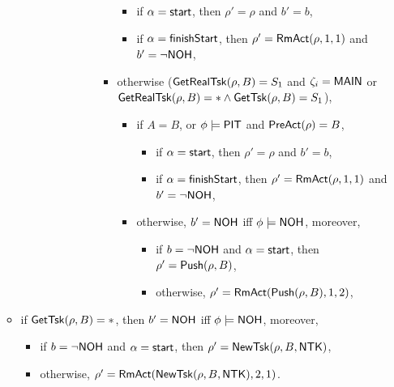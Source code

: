 \begin{itemize}
\begin{itemize}
\begin{itemize}
\begin{itemize}
\begin{itemize}
\begin{itemize}
\begin{itemize}
						\begin{itemize}
							\item if $\alpha = {\mathsf{start} }$, then $\rho' = \rho$ and $b' = b$,
							\item if $\alpha = {\mathsf{finishStart} }$, then $\rho' = \mathsf{RmAct}(\rho, 1, 1)$ and $b' = \neg{\sf NOH}$,
						\end{itemize}
						\item otherwise ($\mathsf{GetRealTsk}(\rho,B) = S_1$ and $\zeta_i = {\sf MAIN}$ or $\mathsf{GetRealTsk}(\rho,B) = * \wedge\mathsf{GetTsk}(\rho,B) = S_1$), 
						\begin{itemize}
							\item if $A = B$, or $\phi \models{\sf PIT}$ and $\mathsf{PreAct}(\rho) = B$, 
							\begin{itemize}
								\item if $\alpha = {\mathsf{start} }$, then $\rho' = \rho$ and $b' = b$,
								\item if $\alpha = {\mathsf{finishStart} }$, then $\rho' = \mathsf{RmAct}(\rho, 1, 1)$ and $b' = \neg{\sf NOH}$,
							\end{itemize}
							\item otherwise, $b' = {\sf NOH}$ iff $\phi \models {\sf NOH}$, moreover, 
							\begin{itemize}
								\item if $b = \neg {\sf NOH}$ and $\alpha = {\mathsf{start} }$, then $\rho'=\mathsf{Push}(\rho, B)$,
								\item otherwise, $\rho' = \mathsf{RmAct}(\mathsf{Push}(\rho, B), 1, 2)$, 
							\end{itemize}
						\end{itemize}
					\end{itemize}
				\end{itemize}
			\end{itemize}
		\end{itemize}
	\end{itemize}
	\item if $\mathsf{GetTsk}(\rho, B) = *$, then $b' = {\sf NOH}$ iff $\phi \models {\sf NOH}$, moreover, 
		\begin{itemize}
			\item if $b = \neg {\sf NOH}$ and $\alpha = {\mathsf{start} }$, then $\rho' = \mathsf{NewTsk}(\rho, B, {\sf NTK})$, 
			\item otherwise, $\rho' = \mathsf{RmAct}(\mathsf{NewTsk}(\rho, B, {\sf NTK}), 2, 1)$.
		\end{itemize}				
	\end{itemize}
\end{itemize}

